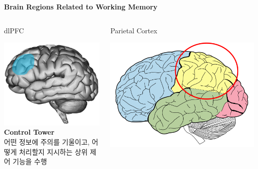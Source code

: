 \documentclass{beamer}
\begin{document}
\begin{frame}{\textbf{Brain Regions Related to Working Memory}}
  \begin{columns}
    \begin{column}{0.31\textwidth}
      \begin{block}{dlPFC}
        \begin{minipage}[t][5cm][c]{\textwidth}
          \centering
          \includegraphics[width=\textwidth]{image/working_memory_b1}
          \textbf{Control Tower}\\
          어떤 정보에 주의를 기울이고, 어떻게 처리할지 지시하는 상위 제어 기능을 수행
        \end{minipage}
      \end{block}
    \end{column}
    \hfill
    \begin{column}{0.31\textwidth}
      \begin{block}{Parietal Cortex}
        \begin{minipage}[t][5cm][c]{\textwidth}
          \centering
          \includegraphics[width=\textwidth]{image/working_memory_b2}\\~\\~\\

\end{minipage}
\end{block}
\end{column}
\end{columns}
\end{frame}
\end{document}
